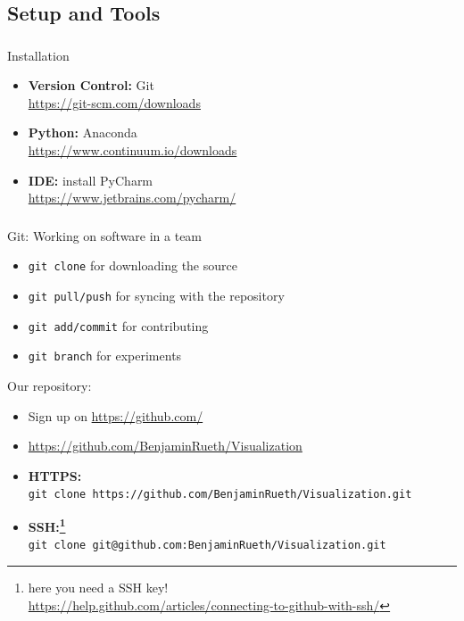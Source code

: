 \documentclass[11pt]{beamer}
\newcommand{\mytexttt}[1]{\colorbox{gray!20}{\texttt{#1}}}
\begin{document}
\subsection{Setup and Tools}
\begin{frame}
\frametitle{\insertsubsection}
\begin{block}{Installation}
\begin{itemize}
\item \textbf{Version Control:} Git \\
{\footnotesize\url{https://git-scm.com/downloads}}
\item \textbf{Python:} Anaconda \\
{\footnotesize\url{https://www.continuum.io/downloads}}
\item \textbf{IDE:} install PyCharm \\
{\footnotesize\url{https://www.jetbrains.com/pycharm/}}
\end{itemize}
\end{block}
\end{frame}

\begin{frame}
\frametitle{\insertsubsection}
\begin{block}{Git: Working on software in a team}
\begin{itemize}
\item \mytexttt{git clone} for downloading the source
\item \mytexttt{git pull/push} for syncing with the repository
\item \mytexttt{git add/commit} for contributing
\item \mytexttt{git branch} for experiments
\end{itemize}
\end{block}

\pause

\begin{block}{Our repository:}
\begin{itemize}
\item Sign up on \url{https://github.com/}
\item \url{https://github.com/BenjaminRueth/Visualization}
\item \textbf{HTTPS:} \\
{\footnotesize\mytexttt{git clone https://github.com/BenjaminRueth/Visualization.git}}
\item \textbf{SSH:\footnote{here you need a SSH key! \\ {\scriptsize\url{https://help.github.com/articles/connecting-to-github-with-ssh/}}}} \\
{\footnotesize\mytexttt{git clone git@github.com:BenjaminRueth/Visualization.git}}
\end{itemize}
\end{block}
\end{frame}
\end{document}
